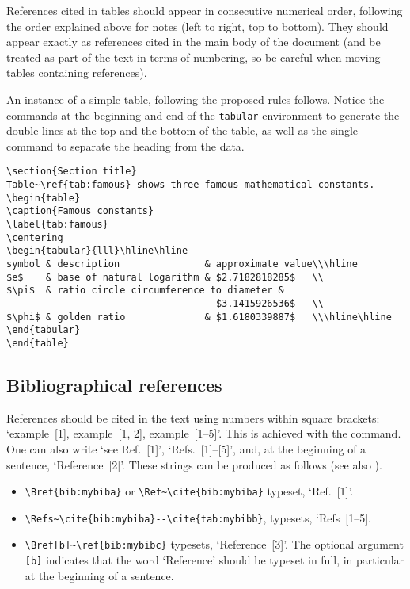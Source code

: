 \documentclass[12pt,twoside,a4paper]{cernrep}
\begin{document}
References cited in tables should appear in consecutive numerical
order, following the order explained above for notes (left to right,
top to bottom).  They should appear exactly as references cited in the
main body of the document (and be treated as part of the text in terms
of numbering, so be careful when moving tables containing references).


An instance of a simple table, following the proposed rules follows.
Notice the  commands at the beginning and end of the
\texttt{tabular} environment to generate the double lines at the top
and the bottom of the table, as well as the single  command
to separate the heading from the data.

\begin{verbatim}
\section{Section title}
Table~\ref{tab:famous} shows three famous mathematical constants.
\begin{table}
\caption{Famous constants}
\label{tab:famous}
\centering
\begin{tabular}{lll}\hline\hline
symbol & description               & approximate value\\\hline
$e$    & base of natural logarithm & $2.7182818285$   \\
$\pi$  & ratio circle circumference to diameter &
                                     $3.1415926536$   \\
$\phi$ & golden ratio              & $1.6180339887$   \\\hline\hline
\end{tabular}
\end{table}
\end{verbatim}

\subsection{Bibliographical references}
\label{sec:biblioref}

References should be cited in the text using numbers within square
brackets: `example~[1], example~[1, 2], example~[1--5]'. This is
achieved with the  command. One can also write `see
Ref.~[1]', `Refs.~[1]--[5]', and, at the beginning of a sentence,
`Reference~[2]'. These strings can be produced as follows (see also
).
\begin{itemize}
\item \verb!\Bref{bib:mybiba}! or \verb!\Ref~\cite{bib:mybiba}! 
      typeset, \eg `Ref.~[1]'.
\item \verb!\Refs~\cite{bib:mybiba}--\cite{tab:mybibb}!, 
      typesets, \eg `Refs~[1--5].
\item \verb!\Bref[b]~\ref{bib:mybibc}! typesets, \eg `Reference~[3]'.
       The optional argument \texttt{[b]} indicates that the word
       `Reference' should be typeset in full, in particular at the
       beginning of a sentence.
\end{itemize}
\end{document}
